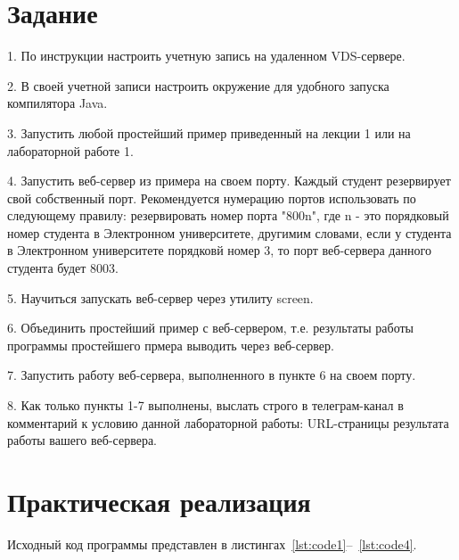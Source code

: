 \documentclass[a4paper, 14pt]{extarticle}
\begin{document}
\section{Задание}\label{Sect::task}
\par
1. По инструкции настроить учетную запись на удаленном VDS-сервере.
\par
2. В своей учетной записи настроить окружение для удобного запуска компилятора Java.
\par
3. Запустить любой простейший пример приведенный на лекции 1 или на лабораторной работе 1.
\par
4. Запустить веб-сервер из примера на своем порту. Каждый студент резервирует свой собственный порт. Рекомендуется нумерацию портов использовать по следующему правилу: резервировать номер порта "800n", где n - это порядковый номер студента в Электронном университете, другимим словами, если у студента в Электронном университете порядковй номер 3, то порт веб-сервера данного студента будет 8003.
\par
5. Научиться запускать веб-сервер через утилиту screen.
\par
6. Объединить простейший пример с веб-сервером, т.е. результаты работы программы простейшего прмера выводить через веб-сервер.
\par
7. Запустить работу веб-сервера, выполненного в пункте 6 на своем порту.
\par
8. Как только пункты 1-7 выполнены, выслать строго в телеграм-канал в комментарий к условию данной лабораторной работы: URL-страницы результата работы вашего веб-сервера.
\section{Практическая реализация}

Исходный код программы представлен в листингах~\ref{lst:code1}--~\ref{lst:code4}.
\end{document}
